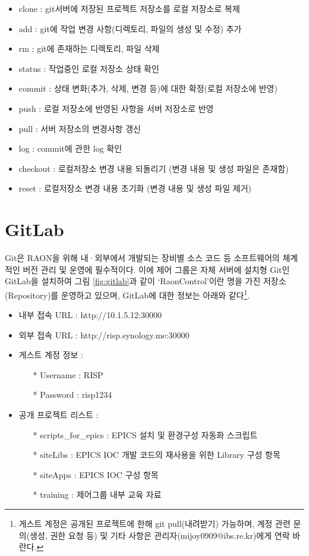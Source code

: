 \documentclass[11pt
  , a4paper
  , article
  , oneside
]{memoir}
\begin{document}
\begin{itemize}
	\item clone : git서버에 저장된 프로젝트 저장소를 로컬 저장소로 복제
	\item add : git에 작업 변경 사항(디렉토리, 파일의 생성 및 수정) 추가 
	\item rm : git에 존재하는 디렉토리, 파일 삭제 
	\item status : 작업중인 로컬 저장소 상태 확인
	\item commit : 상태 변화(추가, 삭제, 변경 등)에 대한 확정(로컬 저장소에 반영)
	\item push : 로컬 저장소에 반영된 사항을 서버 저장소로 반영
	\item pull : 서버 저장소의 변경사항 갱신
	\item log : commit에 관한 log 확인
	\item checkout : 로컬저장소 변경 내용 되돌리기 (변경 내용 및 생성 파일은 존재함)
	\item reset : 로컬저장소 변경 내용 초기화 (변경 내용 및 생성 파일 제거)
\end{itemize}

\chapter{GitLab}
Git은 RAON을 위해 내·외부에서 개발되는 장비별 소스 코드 등 소프트웨어의 체계적인 버전 관리 및 운영에 필수적이다. 이에 제어 그룹은 자체 서버에 설치형 Git인 GitLab을 설치하여 그림 \ref{fig:gitlab}과 같이 ‘RaonControl’이란 명을 가진 저장소(Repository)를 운영하고 있으며, GitLab에 대한 정보는 아래와 같다\footnote{게스트 계정은 공개된 프로젝트에 한해 git pull(내려받기) 가능하며, 계정 관련 문의(생성, 권한 요청 등) 및 기타 사항은 관리자(mijoy0909@ibs.re.kr)에게 연락 바란다.}.
\begin{itemize}
	\item 내부 접속 URL : http://10.1.5.12:30000 
	\item 외부 접속 URL : http://risp.synology.me:30000
	\item 게스트 계정 정보 :
	\begin{itemize}
		\item[*] Username : RISP
		\item[*] Password : risp1234
	\end{itemize}
	\item 공개 프로젝트 리스트 :
	\begin{itemize}
		\item[*] scripts\_for\_epics : EPICS 설치 및 환경구성 자동화 스크립트
		\item[*] siteLibs : EPICS IOC 개발 코드의 재사용을 위한 Library 구성 항목
		\item[*] siteApps : EPICS IOC 구성 항목
		\item[*] training : 제어그룹 내부 교육 자료
	\end{itemize}
\end{itemize}
\end{document}
